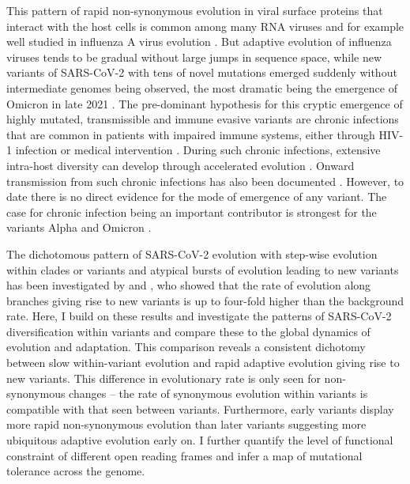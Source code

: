 \documentclass[aps,rmp, twocolumn]{revtex4}
\begin{document}
This pattern of rapid non-synonymous evolution in viral surface proteins that interact with the host cells is common among many RNA viruses and for example well studied in influenza A virus evolution \citep{bhatt_genomic_2011,strelkowa_clonal_2012}.
But adaptive evolution of influenza viruses tends to be gradual without large jumps in sequence space, while new variants of SARS-CoV-2 with tens of novel mutations emerged suddenly without intermediate genomes being observed, the most dramatic being the emergence of Omicron in late 2021 \citep{viana_rapid_2022}.
The pre-dominant hypothesis for this cryptic emergence of highly mutated, transmissible and immune evasive variants are chronic infections that are common in patients with impaired immune systems, either through HIV-1 infection \citep{cele_sars-cov-2_2022} or medical intervention \citep{choi_persistence_2020,kemp_sars-cov-2_2021}.
During such chronic infections, extensive intra-host diversity can develop through accelerated evolution
\citep{chaguza_accelerated_2022}.
Onward transmission from such chronic infections has also been documented \citep{gonzalez-reiche_intrahost_2022}.
However, to date there is no direct evidence for the mode of emergence of any variant.
The case for chronic infection being an important contributor is strongest for the variants Alpha and Omicron \citep{hill_origins_2022}.

The dichotomous pattern of SARS-CoV-2 evolution with step-wise evolution within clades or variants and atypical bursts of evolution leading to new variants has been investigated by \citet{tay_emergence_2022} and \citet{hill_origins_2022}, who showed that the rate of evolution along branches giving rise to new variants is up to four-fold higher than the background rate.
Here, I build on these results and investigate the patterns of SARS-CoV-2 diversification within variants and compare these to the global dynamics of evolution and adaptation.
This comparison reveals a consistent dichotomy between slow within-variant evolution and rapid adaptive evolution giving rise to new variants.
This difference in evolutionary rate is only seen for non-synonymous changes -- the rate of synonymous evolution within variants is compatible with that seen between variants.
Furthermore, early variants display more rapid non-synonymous evolution than later variants suggesting more ubiquitous adaptive evolution early on.
I further quantify the level of functional constraint of different open reading frames and infer a map of mutational tolerance across the genome.
\end{document}
